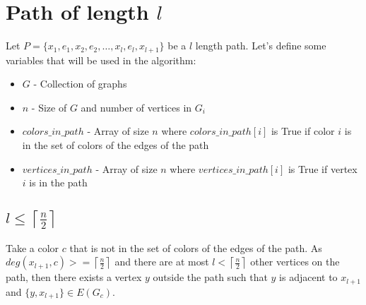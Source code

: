 \begin{center}
\end{center}

\section{Path of length $l$}

Let $P = \{x_1, e_1, x_2, e_2, \dots, x_{l}, e_{l}, x_{l + 1}\}$ be a $l$ length path. Let's define some variables that will
be used in the algorithm:

\begin{itemize}
    \item $G$ - Collection of graphs
    \item $n$ - Size of $G$ and number of vertices in $G_i$
    \item $colors\_in\_path$ - Array of size $n$ where $colors\_in\_path[i]$ is True if color $i$ is in the set of colors of the edges of the path
    \item $vertices\_in\_path$ - Array of size $n$ where $vertices\_in\_path[i]$ is True if vertex $i$ is in the path
\end{itemize}

\subsection{$l \leq \left \lceil \frac{n}{2} \right \rceil$}

Take a color $c$ that is not in the set of colors of the edges of the path. As $deg(x_{l + 1}, c) >= \left \lceil \frac{n}{2} \right \rceil$
and there are at most $l < \left \lceil \frac{n}{2} \right \rceil$ other vertices on the path, then there exists a 
vertex $y$ outside the path such that $y$ is adjacent to $x_{l + 1}$ and $\{y, x_{l + 1}\} \in E(G_c)$.

